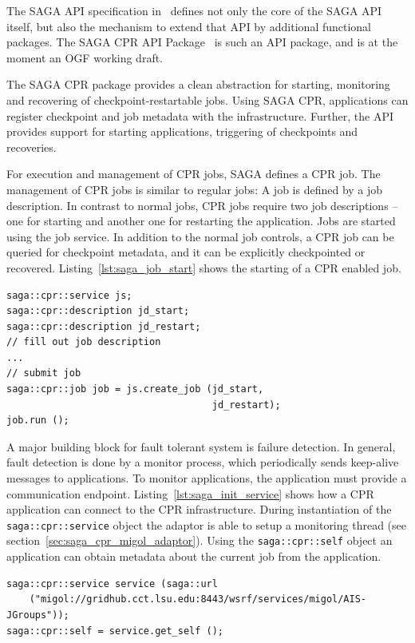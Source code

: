 \documentclass[times, 10pt,twocolumn]{article}
\begin{document}

The SAGA API specification in~\cite{saga_gfd90} defines not only the
core of the SAGA API itself, but also the mechanism to extend that API
by additional functional packages.  The SAGA CPR API
Package~\cite{saga_cpr_draft} is such an API package, and is at the
moment an OGF working draft.

The SAGA CPR package provides a clean abstraction for starting,
monitoring and recovering of checkpoint-restartable jobs.
Using SAGA CPR, applications can register checkpoint and job metadata with the infrastructure. 
Further, the API provides support for starting applications, triggering of checkpoints and recoveries.

For execution and management of CPR jobs, SAGA defines a CPR job. The management of 
CPR jobs is similar to regular jobs: A job is defined by a job description. In contrast to normal jobs, 
CPR jobs require  two job descriptions -- one for starting and another one for restarting the application.
Jobs are started using the job service. In addition to the normal job controls, a CPR job can be queried for checkpoint metadata, and 
it can be explicitly checkpointed or recovered. Listing~\ref{lst:saga_job_start} shows the starting of a CPR enabled job.

\begin{lstlisting}[style=myListing, caption={SAGA CPR: Starting a Job with CPR Support},  label={lst:saga_job_start}]
saga::cpr::service js; 
saga::cpr::description jd_start;
saga::cpr::description jd_restart;
// fill out job description
...
// submit job  
saga::cpr::job job = js.create_job (jd_start, 
                                    jd_restart);
job.run ();
\end{lstlisting}
    
A major building block for fault tolerant system is failure detection. In general, fault detection is done by a monitor process, 
which periodically sends keep-alive messages to applications. To monitor applications, the application must provide a communication endpoint.
Listing~\ref{lst:saga_init_service} shows how a CPR application can connect to the CPR infrastructure. During instantiation of the \texttt{saga::cpr::service} object the adaptor is able to setup a monitoring thread (see section~\ref{sec:saga_cpr_migol_adaptor}). Using the \texttt{saga::cpr::self} object an application can obtain metadata about the current job from the application.                                                                               
\begin{lstlisting}[style=myListing, caption={SAGA CPR: Initialize Migol Session}, label={lst:saga_init_service}]
saga::cpr::service service (saga::url 
    ("migol://gridhub.cct.lsu.edu:8443/wsrf/services/migol/AIS-JGroups"));
saga::cpr::self = service.get_self ();
\end{lstlisting}
      
\end{document}
